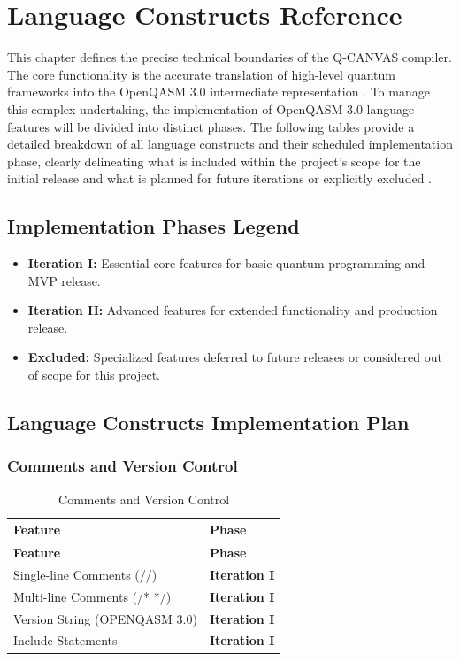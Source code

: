 \chapter{Language Constructs Reference}
\label{ch:scope}

This chapter defines the precise technical boundaries of the Q-CANVAS compiler. The core functionality is the accurate translation of high-level quantum frameworks into the OpenQASM 3.0 intermediate representation \cite{mckay2018}. To manage this complex undertaking, the implementation of OpenQASM 3.0 language features will be divided into distinct phases. The following tables provide a detailed breakdown of all language constructs and their scheduled implementation phase, clearly delineating what is included within the project's scope for the initial release and what is planned for future iterations or explicitly excluded \cite{barenco1995}.

\section{Implementation Phases Legend}
\begin{itemize}
    \item \textbf{Iteration I:} Essential core features for basic quantum programming and MVP release.
    \item \textbf{Iteration II:} Advanced features for extended functionality and production release.
    \item \textbf{Excluded:} Specialized features deferred to future releases or considered out of scope for this project.
\end{itemize}

\section{Language Constructs Implementation Plan}

\subsection{Comments and Version Control}
\begin{longtable}{@{}p{10cm}l@{}}
\caption{Comments and Version Control}\label{tab:comments-version}\\
\toprule
\textbf{Feature} & \textbf{Phase} \\
\midrule
\endfirsthead
\toprule
\textbf{Feature} & \textbf{Phase} \\
\midrule
\endhead
Single-line Comments (//) & \textbf{Iteration I} \\
Multi-line Comments (/* */) & \textbf{Iteration I} \\
Version String (OPENQASM 3.0) & \textbf{Iteration I} \\
Include Statements & \textbf{Iteration I} \\
\bottomrule
\end{longtable}

